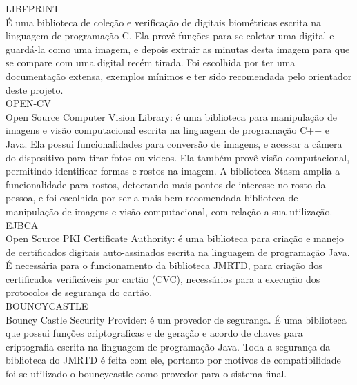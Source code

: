 \documentclass{article}
\begin{document}
\begin{flushleft}
		\vspace{10px}
        \hspace{2cm}LIBFPRINT\cite{PRINT}\\
    \hspace{2cm}É uma biblioteca de coleção e verificação de digitais biométricas escrita na linguagem de programação C. Ela provê funções para se coletar uma digital e guardá-la como uma imagem, e depois extrair as minutas desta imagem para que se compare com uma digital recém tirada. Foi escolhida por ter uma documentação extensa, exemplos mínimos e ter sido recomendada pelo orientador deste projeto.\\
		\vspace{10px}
        \hspace{2cm}OPEN-CV\cite{OPENCV}\\
    \hspace{2cm}Open Source Computer Vision Library: é uma biblioteca para manipulação de imagens e visão computacional escrita na linguagem de programação C++ e Java. Ela possui funcionalidades para conversão de imagens, e acessar a câmera do dispositivo para tirar fotos ou videos. Ela também provê visão computacional, permitindo identificar formas e rostos na imagem. A biblioteca Stasm amplia a funcionalidade para rostos, detectando mais pontos de interesse no rosto da pessoa, e foi escolhida por ser a mais bem recomendada biblioteca de manipulação de imagens e visão computacional, com relação a sua utilização.\\
		\vspace{10px}
        \hspace{2cm}EJBCA\cite{EJBCA}\\
    \hspace{2cm}Open Source PKI Certificate Authority: é uma biblioteca para criação e manejo de certificados digitais auto-assinados escrita na linguagem de programação Java. É necessária para o funcionamento da biblioteca JMRTD, para criação dos certificados verificáveis por cartão (CVC), necessários para a execução dos protocolos de segurança do cartão.\\
		\vspace{10px}
        \hspace{2cm}BOUNCYCASTLE\cite{BOUNCYCASTLE}\\
    \hspace{2cm}Bouncy Castle Security Provider: é um provedor de segurança. É uma biblioteca que possui funções criptograficas e de geração e acordo de chaves para criptografia escrita na linguagem de programação Java. Toda a segurança da biblioteca do JMRTD é feita com ele, portanto por motivos de compatibilidade foi-se utilizado o bouncycastle como provedor para o sistema final.\\

			
		\end{flushleft}
\end{document}
